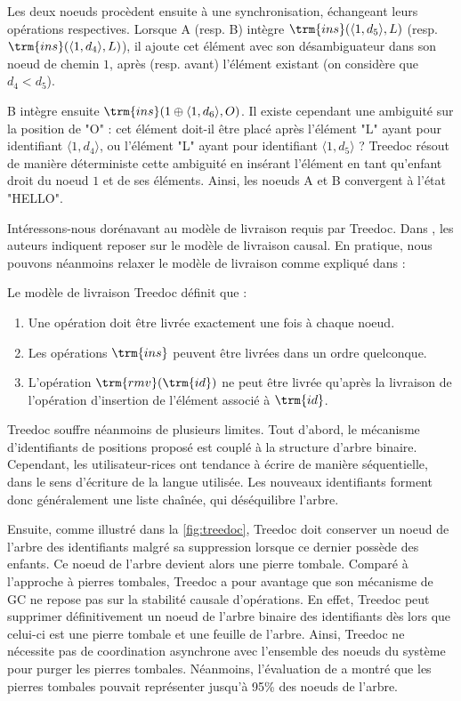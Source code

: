 Les deux noeuds procèdent ensuite à une synchronisation, échangeant leurs opérations respectives.
Lorsque A (resp. B) intègre $\trm{ins}(\langle 1,d_5 \rangle, L)$ (resp. $\trm{ins}(\langle 1,d_4 \rangle, L)$), il ajoute cet élément avec son désambiguateur dans son noeud de chemin $1$, après (resp. avant) l'élément existant (on considère que $d_4 < d_5$).

B intègre ensuite $\trm{ins}(1 \oplus \langle 1,d_6 \rangle, O)$.
Il existe cependant une ambiguité sur la position de "O" : cet élément doit-il être placé après l'élément "L" ayant pour identifiant $\langle 1,d_4 \rangle$, ou l'élément "L" ayant pour identifiant $\langle 1,d_5 \rangle$ ?
Treedoc résout de manière déterministe cette ambiguité en insérant l'élément en tant qu'enfant droit du noeud $1$ et de ses éléments.
Ainsi, les noeuds A et B convergent à l'état "HELLO".

Intéressons-nous dorénavant au modèle de livraison requis par Treedoc.
Dans \cite{2009-treedoc-preguica}, les auteurs indiquent reposer sur le modèle de livraison causal.
En pratique, nous pouvons néanmoins relaxer le modèle de livraison comme expliqué dans \cite{2021-these-vic} :
\begin{definition}
  Le modèle de livraison Treedoc définit que :
  \begin{enumerate}
    \item Une opération doit être livrée exactement une fois à chaque noeud.
    \item Les opérations $\trm{ins}$ peuvent être livrées dans un ordre quelconque.
    \item L'opération $\trm{rmv}(\trm{id})$ ne peut être livrée qu'après la livraison de l'opération d'insertion de l'élément associé à $\trm{id}$.
  \end{enumerate}
\end{definition}

Treedoc souffre néanmoins de plusieurs limites.
Tout d'abord, le mécanisme d'identifiants de positions proposé est couplé à la structure d'arbre binaire.
Cependant, les utilisateur-rices ont tendance à écrire de manière séquentielle, \ie dans le sens d'écriture de la langue utilisée.
Les nouveaux identifiants forment donc généralement une liste chaînée, qui déséquilibre l'arbre.

Ensuite, comme illustré dans la \autoref{fig:treedoc}, Treedoc doit conserver un noeud de l'arbre des identifiants malgré sa suppression lorsque ce dernier possède des enfants.
Ce noeud de l'arbre devient alors une pierre tombale.
Comparé à l'approche à pierres tombales, Treedoc a pour avantage que son mécanisme de \ac{GC} ne repose pas sur la stabilité causale d'opérations.
En effet, Treedoc peut supprimer définitivement un noeud de l'arbre binaire des identifiants dès lors que celui-ci est une pierre tombale et une feuille de l'arbre.
Ainsi, Treedoc ne nécessite pas de coordination asynchrone avec l'ensemble des noeuds du système pour purger les pierres tombales.
Néanmoins, l'évaluation de \cite{2009-treedoc-preguica} a montré que les pierres tombales pouvait représenter jusqu'à 95\% des noeuds de l'arbre.

